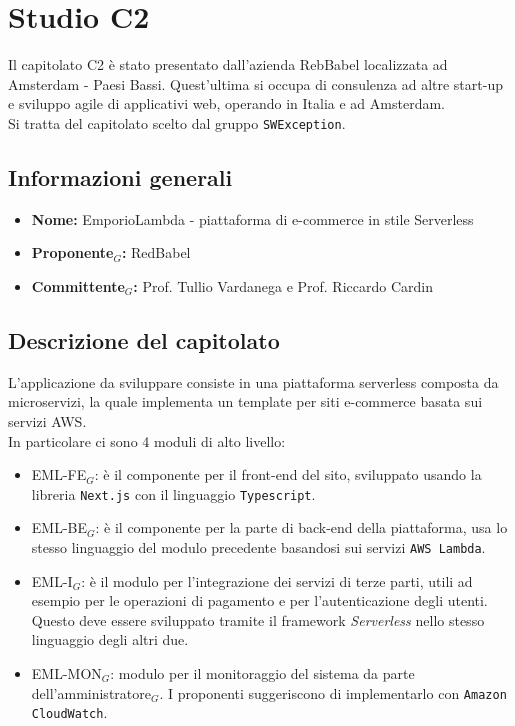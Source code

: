\section{Studio C2}
Il capitolato C2 è stato presentato dall'azienda RebBabel localizzata ad Amsterdam - Paesi Bassi. Quest'ultima si occupa di consulenza ad altre start-up e sviluppo agile di applicativi web, operando in Italia e ad Amsterdam.\\
Si tratta del capitolato scelto dal gruppo \verb|SWException|.

\subsection{Informazioni generali}
\begin{itemize}
	\item \textbf{Nome:} EmporioLambda - piattaforma di e-commerce in stile Serverless
	\item \textbf{Proponente$_G$:} RedBabel
	\item \textbf{Committente$_G$:} Prof. Tullio Vardanega e Prof. Riccardo Cardin
\end{itemize}

\subsection{Descrizione del capitolato}
L'applicazione da sviluppare consiste in una piattaforma serverless composta da microservizi, la quale implementa un template per siti e-commerce basata sui servizi AWS.\\
In particolare ci sono 4 moduli di alto livello:
\begin{itemize}
	\item EML-FE$_G$: è il componente per il front-end del sito, sviluppato usando la libreria \verb|Next.js| con il linguaggio \verb|Typescript|.
	\item EML-BE$_G$: è il componente per la parte di back-end della piattaforma, usa lo stesso linguaggio del modulo precedente basandosi sui servizi \verb|AWS Lambda|.
	\item EML-I$_G$: è il modulo per l'integrazione dei servizi di terze parti, utili ad esempio per le operazioni di pagamento e per l'autenticazione degli utenti. Questo deve essere sviluppato tramite il framework \textit{Serverless} nello stesso linguaggio degli altri due.
	\item EML-MON$_G$: modulo per il monitoraggio del sistema da parte dell'amministratore$_G$. I proponenti suggeriscono di implementarlo con \verb|Amazon CloudWatch|.
\end{itemize}

